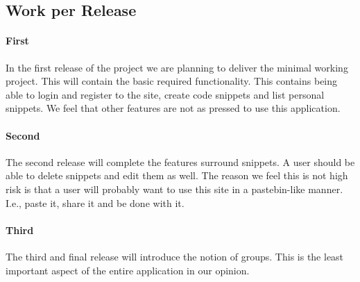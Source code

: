 \documentclass[10pt,a4paper,BCOR12mm, headexclude, footexclude,
  twoside, openright]{scrartcl}
\numberwithin{equation}{section} %
\numberwithin{figure}{section} %
\numberwithin{table}{section} %
\begin{document}
\subsection{Work per Release}
\paragraph{First} In the first release of the project we are planning to deliver the minimal
working project. This will contain the basic required functionality. This
contains being able to login and register to the site, create code snippets and
list personal snippets. We feel that other features are not as pressed to use this application.

\paragraph{Second} The second release will complete the features surround
snippets. A user should be able to delete snippets and edit them as well. The
reason we feel this is not high risk is that a user will probably want to use
this site in a pastebin-like manner. I.e., paste it, share it and be done with
it.

\paragraph{Third} The third and final release will introduce the notion of
groups. This is the least important aspect of the entire application in our
opinion.





\end{document}
